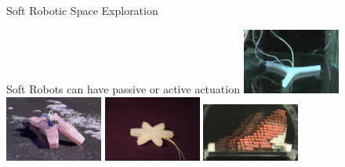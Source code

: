 \documentclass[6pt]{beamer}
\begin{document}
{\begin{frame}{Soft Robotic Space Exploration}
\vspace{0.2cm}
\begin{block}{Soft Robots can have passive or active actuation}
\vspace{0.05cm}
\includegraphics[width=0.24\textwidth,height=0.20\textheight]{../Figures/Misc/ExplodingRobot.jpg}\hspace{0.05cm}	
\includegraphics[width=0.24\textwidth,height=0.20\textheight]{../Figures/Misc/softbot.jpg}\hspace{0.05cm}	
\includegraphics[width=0.24\textwidth,height=0.20\textheight]{../Figures/Misc/soft_robotics_figure.png}\hspace{0.05cm}			
\includegraphics[width=0.24\textwidth,height=0.20\textheight]{../Figures/Misc/hillerPressureChamber.png}
\end{block}
\begin{center}
\end{center}
\end{frame}
}
\end{document}
